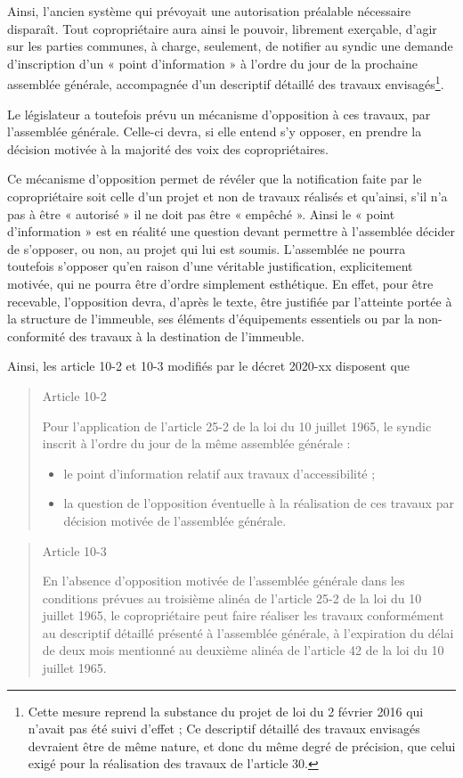 			Ainsi, l’ancien système qui prévoyait une autorisation préalable nécessaire disparaît. Tout copropriétaire aura ainsi le pouvoir, librement exerçable, d’agir sur les parties communes, à charge, seulement, de notifier au syndic une demande d’inscription d’un « point d’information » à l’ordre du jour de la prochaine assemblée générale, accompagnée d’un descriptif détaillé des travaux envisagés\footnote{Cette mesure reprend la substance du projet de loi du 2 février 2016 qui n’avait pas été suivi d’effet ; Ce descriptif détaillé des travaux envisagés devraient être de même nature, et donc du même degré de précision, que celui exigé pour la réalisation des travaux de l’article 30.}.
			
			Le législateur a toutefois prévu un mécanisme d’opposition à ces travaux, par l’assemblée générale. Celle-ci devra, si elle entend s’y opposer, en prendre la décision motivée à la majorité des voix des copropriétaires.
			
			Ce mécanisme d’opposition permet de révéler que la notification faite par le copropriétaire soit celle d’un projet et non de travaux réalisés et qu’ainsi, s’il n’a pas à être « autorisé » il ne doit pas être « empêché ». Ainsi le « point d’information » est en réalité une question devant permettre à l’assemblée décider de s’opposer, ou non, au projet qui lui est soumis. L’assemblée ne pourra toutefois s’opposer qu’en raison d’une véritable justification, explicitement motivée, qui ne pourra être d’ordre simplement esthétique. En effet, pour être recevable, l’opposition devra, d’après le texte, être justifiée par l’atteinte portée à la structure de l’immeuble, ses
			éléments d’équipements essentiels ou par la non-conformité des travaux à la destination de l’immeuble.
			
			Ainsi, les article 10-2 et 10-3 modifiés par le décret 2020-xx disposent que
			\begin{quote}
				Article 10-2
				
				Pour l’application de l’article 25-2 de la loi du 10 juillet 1965, le syndic inscrit à l’ordre du jour de la même assemblée générale :
				\begin{itemize}
					\item le point d’information relatif aux travaux d’accessibilité ;
					\item la question de l’opposition éventuelle à la réalisation de ces travaux par décision motivée de l’assemblée générale.
				\end{itemize}
			\end{quote}
			\begin{quote}
				Article 10-3
				
				En l’absence d’opposition motivée de l’assemblée générale dans les conditions prévues au troisième alinéa de l’article 25-2 de la loi du 10 juillet 1965, le copropriétaire peut faire réaliser les travaux conformément au descriptif détaillé présenté à l’assemblée générale, à l’expiration du délai de deux mois mentionné au deuxième alinéa de l’article 42 de la loi du 10 juillet 1965.
			\end{quote}
			
